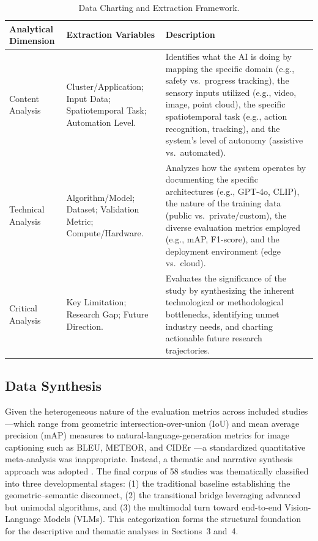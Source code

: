 \documentclass[10pt,letterpaper]{article}
\begin{document}
\begin{table}[H]
\caption{Data Charting and Extraction Framework.}
\label{tab:charting}
\small
{}
\begin{tabularx}{\textwidth}{L{2.6cm} L{4.5cm} Y}
\toprule
{}
\textbf{Analytical Dimension} & \textbf{Extraction Variables} & \textbf{Description}\\
\midrule
Content Analysis & Cluster/Application; Input Data; Spatiotemporal Task; Automation Level. & Identifies what the AI is doing by mapping the specific domain (e.g., safety vs.\ progress tracking), the sensory inputs utilized (e.g., video, image, point cloud), the specific spatiotemporal task (e.g., action recognition, tracking), and the system's level of autonomy (assistive vs.\ automated).\\
Technical Analysis & Algorithm/Model; Dataset; Validation Metric; Compute/Hardware. & Analyzes how the system operates by documenting the specific architectures (e.g., GPT-4o, CLIP), the nature of the training data (public vs.\ private/custom), the diverse evaluation metrics employed (e.g., mAP, F1-score), and the deployment environment (edge vs.\ cloud).\\
Critical Analysis & Key Limitation; Research Gap; Future Direction. & Evaluates the significance of the study by synthesizing the inherent technological or methodological bottlenecks, identifying unmet industry needs, and charting actionable future research trajectories.\\
\bottomrule
\end{tabularx}
\end{table}

\subsection{Data Synthesis}

Given the heterogeneous nature of the evaluation metrics across included studies---which range from geometric intersection-over-union (IoU) and mean average precision (mAP) measures \cite{nath2020,wang2024} to natural-language-generation metrics for image captioning such as BLEU, METEOR, and CIDEr \cite{jung2024,xiao2022}---a standardized quantitative meta-analysis was inappropriate. Instead, a thematic and narrative synthesis approach was adopted \cite{tricco2018}. The final corpus of 58 studies was thematically classified into three developmental stages: (1) the traditional baseline establishing the geometric--semantic disconnect, (2) the transitional bridge leveraging advanced but unimodal algorithms, and (3) the multimodal turn toward end-to-end Vision-Language Models (VLMs). This categorization forms the structural foundation for the descriptive and thematic analyses in Sections~3 and~4.
\end{document}
